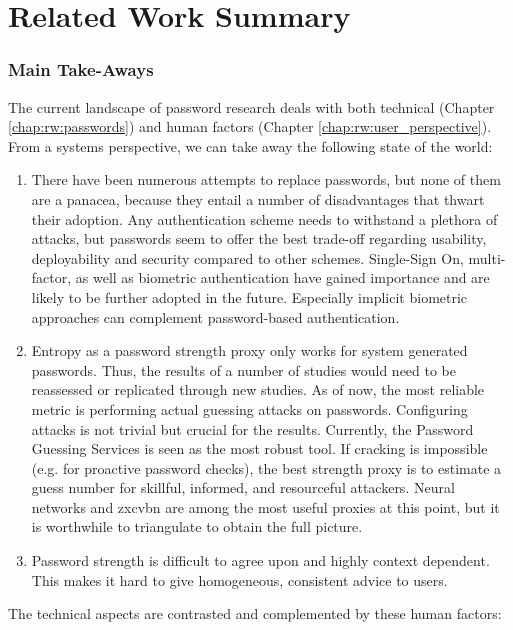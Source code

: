 
\chapter[Related Work Summary]{Related Work Summary}\label{chap:rw:summary}

\subsection{Main Take-Aways}
The current landscape of password research deals with both technical (Chapter \ref{chap:rw:passwords}) and human factors (Chapter \ref{chap:rw:user_perspective}). From a systems perspective, we can take away the following state of the world:
\begin{enumerate}
	\item There have been numerous attempts to replace passwords, but none of them are a panacea, because they entail a number of disadvantages that thwart their adoption. Any authentication scheme needs to withstand a plethora of attacks, but passwords seem to offer the best trade-off regarding usability, deployability and security compared to other schemes. Single-Sign On, multi-factor, as well as biometric authentication have gained importance and are likely to be further adopted in the future. Especially implicit biometric approaches can complement password-based authentication.
	\item Entropy as a password strength proxy only works for system generated passwords. Thus, the results of a number of studies would need to be reassessed or replicated through new studies. As of now, the most reliable metric is performing actual guessing attacks on passwords. Configuring attacks is not trivial but crucial for the results. Currently, the Password Guessing Services is seen as the most robust tool. If cracking is impossible (e.g. for proactive password checks), the best strength proxy is to estimate a guess number for skillful, informed, and resourceful attackers. Neural networks and zxcvbn are among the most useful proxies at this point, but it is worthwhile to triangulate to obtain the full picture.  
	\item Password strength is difficult to agree upon and highly context dependent. This makes it hard to give homogeneous, consistent advice to users.
\end{enumerate}
The technical aspects are contrasted and complemented by these human factors:
